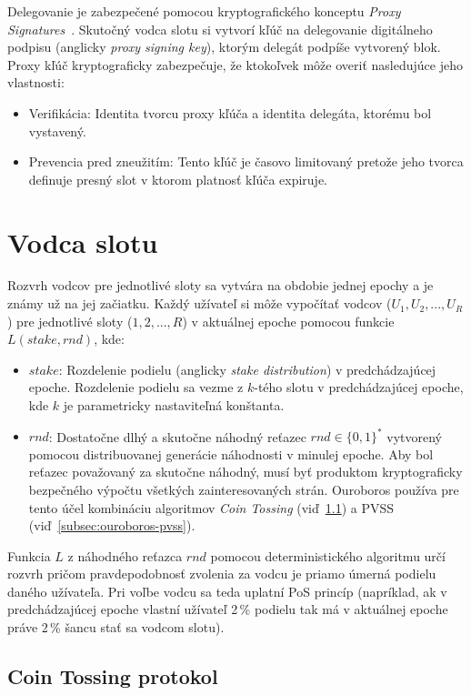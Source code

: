 Delegovanie je zabezpečené pomocou kryptografického konceptu \textit{Proxy Signatures}~\cite{proxySig}. Skutočný vodca slotu si vytvorí kľúč na delegovanie digitálneho podpisu (anglicky \textit{proxy signing key}), ktorým delegát podpíše vytvorený blok. Proxy kľúč kryptograficky zabezpečuje, že ktokoľvek môže overiť nasledujúce jeho vlastnosti:
\begin{itemize}
	\item Verifikácia: Identita tvorcu proxy kľúča a identita delegáta, ktorému bol vystavený.
	\item Prevencia pred zneužitím: Tento kľúč je časovo limitovaný pretože jeho tvorca definuje presný slot v ktorom platnosť kľúča expiruje. 
\end{itemize}

\section{Vodca slotu}\label{sec:ouroboros-slot-leader}

Rozvrh vodcov pre jednotlivé sloty sa vytvára na obdobie jednej epochy a je známy už na jej začiatku. Každý užívateľ si môže vypočítať vodcov ($U_1, U_2,  ..., U_R$) pre jednotlivé sloty ($1, 2, ..., R$) v aktuálnej epoche pomocou funkcie $L(stake, rnd)$, kde:
\begin{itemize}
	\item $stake$: Rozdelenie podielu (anglicky \textit{stake distribution}) v predchádzajúcej epoche. Rozdelenie podielu sa vezme z $k$-tého slotu v predchádzajúcej epoche, kde $k$ je parametricky nastaviteľná konštanta.
	\item $rnd$: Dostatočne dlhý a skutočne náhodný reťazec $rnd \in \{0,1\}^*$ vytvorený pomocou distribuovanej generácie náhodnosti v minulej epoche. Aby bol reťazec považovaný za skutočne náhodný, musí byť produktom kryptograficky bezpečného výpočtu všetkých zainteresovaných strán. Ouroboros používa pre tento účel kombináciu algoritmov \textit{Coin Tossing} (viď~\ref{subsec:ouroboros-coin-tossing}) a PVSS (viď~\ref{subsec:ouroboros-pvss}).
\end{itemize}
Funkcia $L$ z náhodného reťazca $rnd$ pomocou deterministického algoritmu určí rozvrh pričom pravdepodobnosť zvolenia za vodcu je priamo úmerná podielu daného užívateľa. Pri voľbe vodcu sa teda uplatní PoS princíp (napríklad, ak v predchádzajúcej epoche vlastní užívateľ 2\,\% podielu tak má v aktuálnej epoche práve 2\,\% šancu stať sa vodcom slotu).

\subsection{Coin Tossing protokol}\label{subsec:ouroboros-coin-tossing}

